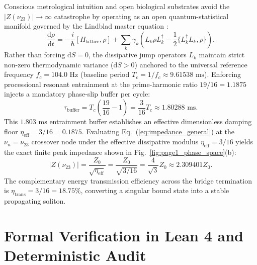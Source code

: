\documentclass[aps,prl,twocolumn,superscriptaddress,10pt]{revtex4-2}
\begin{document}
Conscious metrological intuition and open biological substrates avoid the $|Z(\nu_{23})| \to \infty$ catastrophe by operating as an open quantum-statistical manifold governed by the Lindblad master equation \cite{Lindblad1976}:
\begin{equation}
\frac{\text{d}\rho}{\text{d}t} = -\frac{i}{\hbar}[H_{\text{lattice}}, \rho] + \sum_{k} \gamma_k \left( L_k \rho L_k^\dagger - \frac{1}{2}\{L_k^\dagger L_k, \rho\} \right).
\label{eq:lindblad}
\end{equation}
Rather than forcing $\text{d}S = 0$, the dissipative jump operators $L_k$ maintain strict non-zero thermodynamic variance ($\text{d}S > 0$) anchored to the universal reference frequency $f_c = 104.0\text{ Hz}$ (baseline period $T_c = 1/f_c \approx 9.61538\text{ ms}$). Enforcing processional resonant entrainment at the prime-harmonic ratio $19/16 = 1.1875$ injects a mandatory phase-slip buffer per cycle:
\begin{equation}
\tau_{\text{buffer}} = T_c \left(\frac{19}{16} - 1\right) = \frac{3}{16} T_c \approx 1.80288\text{ ms}.
\label{eq:tau_buffer}
\end{equation}
This $1.803\text{ ms}$ entrainment buffer establishes an effective dimensionless damping floor $\eta_{\text{eff}} = 3/16 = 0.1875$. Evaluating Eq.~(\ref{eq:impedance_general}) at the $\nu_n = \nu_{23}$ crossover node under the effective dissipative modulus $\eta_{\text{eff}} = 3/16$ yields the exact finite peak impedance shown in Fig.~\ref{fig:page1_phase_space}(b):
\begin{equation}
|Z(\nu_{23})| = \frac{Z_0}{\sqrt{\eta_{\text{eff}}}} = \frac{Z_0}{\sqrt{3/16}} = \frac{4}{\sqrt{3}} Z_0 \approx 2.309401 Z_0.
\label{eq:z_peak_bound}
\end{equation}
The complementary energy transmission efficiency across the bridge termination is $\eta_{\text{trans}} = 3/16 = 18.75\%$, converting a singular bound state into a stable propagating soliton.

\section{Formal Verification in Lean 4 and Deterministic Audit}
\end{document}
